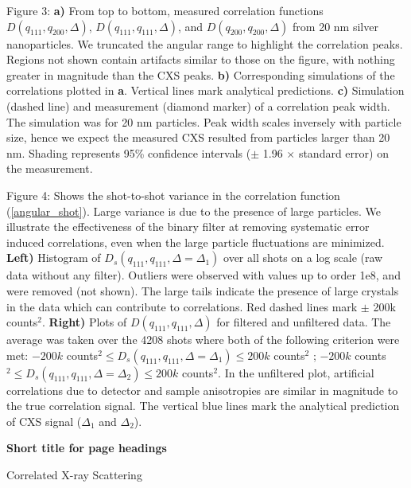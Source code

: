 \documentclass [11pt,fleqn]{article}
\begin{document}
Figure 3:
{\bf a)} From top to bottom, measured correlation functions $D (q_{111},q_{200}, \Delta  )$, $D (q_{111},q_{111}, \Delta  )$, and $D (q_{200},q_{200}, \Delta  )$ from 20 nm silver nanoparticles. We truncated the angular range to highlight the correlation peaks. Regions not shown contain artifacts similar to those on the figure, with nothing greater in magnitude than the CXS peaks. {\bf b)} Corresponding simulations of the correlations plotted in {\bf a}. Vertical lines mark analytical predictions. {\bf c)} Simulation (dashed line) and measurement (diamond marker) of a correlation peak width. The simulation was for 20 nm particles. Peak width scales inversely with particle size, hence we expect the measured CXS resulted from particles larger than 20 nm. Shading represents 95\% confidence intervals ($\pm$ 1.96 $\times $ standard error) on the measurement.

Figure 4:
Shows the shot-to-shot variance in the correlation function (\ref{angular_shot}). Large variance is due to the presence of large particles. We illustrate the effectiveness of the binary filter at removing systematic error induced correlations, even when the large particle fluctuations are minimized. {\bf Left)} Histogram of $D_s(q_{111}, q_{111}, \Delta = \Delta_1)$ over all shots on a log scale (raw data without any filter). Outliers were observed with values up to order 1e8, and were removed (not shown). The large tails indicate the presence of large crystals in the data which can contribute to correlations. Red dashed lines mark $\pm$ 200k counts$^2$. {\bf Right)} Plots of $D(q_{111}, q_{111}, \Delta)$ for filtered and unfiltered data. The average was taken over the 4208 shots where both of the following criterion were met: $-200k $ counts$^2 \le D_s(q_{111}, q_{111}, \Delta = \Delta_1) \le 200k$ counts$^2$ ; $-200k $ counts$^2 \le D_s(q_{111}, q_{111}, \Delta = \Delta_2) \le 200k$ counts$^2$. In the unfiltered plot, artificial correlations due to detector and sample anisotropies are similar in magnitude to the true correlation signal. The vertical blue lines mark the analytical prediction of CXS signal ($\Delta_1$ and $\Delta_2$).

{\bf Short title for page headings}

Correlated X-ray Scattering
\end{document}

